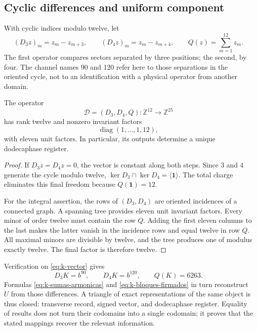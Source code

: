 \subsection{Cyclic differences and uniform component}
\label{subsec:k-transversal}

With cyclic indices modulo twelve, let
\[
 (D_3z)_m=z_m-z_{m+3},\qquad(D_4z)_m=z_m-z_{m+4},
 \qquad Q(z)=\sum_{m=1}^{12}z_m.
\]
The first operator compares sectors separated by three positions; the second,
by four. The channel names 90 and 120 refer here to those separations in the
oriented cycle, not to an identification with a physical operator from
another domain.

\begin{proposition}
\label{prop:k-transversal}
The operator
\[
 \mathcal D=(D_3,D_4,Q):\mathbb Z^{12}\longrightarrow\mathbb Z^{25}
\]
has rank twelve and nonzero invariant factors
\[
 \operatorname{diag}(1,\ldots,1,12),
\]
with eleven unit factors. In particular, its outputs determine a unique dodecaphase register.
\end{proposition}

\begin{proof}
If \(D_3z=D_4z=0\), the vector is constant along both steps.
Since \(3\) and \(4\) generate the cycle modulo twelve,
\(\ker D_3\cap\ker D_4=\langle\mathbf1\rangle\). The total charge
eliminates this final freedom because \(Q(\mathbf1)=12\).

For the integral assertion, the rows of \((D_3,D_4)\) are oriented
incidences of a connected graph. A spanning tree provides eleven unit
invariant factors. Every minor of order twelve must contain the row \(Q\).
Adding the first eleven columns to the last makes the latter vanish in the
incidence rows and equal twelve in row \(Q\). All maximal minors are divisible
by twelve, and the tree produces one of modulus exactly twelve. The final
factor is therefore twelve.
\end{proof}

Verification on \eqref{eq:k-vector} gives
\[
 D_3K=b^{90},\qquad D_4K=b^{120},\qquad Q(K)=6263.
\]
Formulas \eqref{eq:k-sumas-armonicas} and
\eqref{eq:k-bloques-firmados} in turn reconstruct \(U\) from those
differences. A triangle of exact representations of the same object is thus
closed: transverse record, signed vector, and dodecaphase register. Equality
of results does not turn their codomains into a single codomain; it proves
that the stated mappings recover the relevant information.

